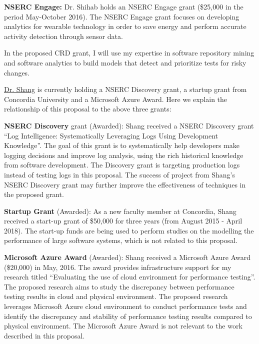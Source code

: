 \documentclass[12pt, letterpaper]{article}
\begin{document}
\textbf{NSERC Engage:} Dr. Shihab holds an NSERC Engage grant (\$25,000 in the period May-October 2016). The NSERC Engage grant focuses on developing analytics for wearable technology in order to save energy and perform accurate activity detection through sensor data.

In the proposed CRD grant, I will use my expertise in software repository mining and software analytics to build models that detect and prioritize tests for risky changes.

\underline{Dr. Shang} is currently holding a NSERC Discovery grant, a startup grant from Concordia University and a Microsoft Azure Award. Here we explain the relationship of this proposal to the above three grants:

\textbf{NSERC Discovery} grant (Awarded): Shang received a NSERC Discovery grant ``Log Intelligence: Systematically Leveraging Logs Using Development Knowledge''. The goal of this grant is to systematically help developers make logging decisions and improve log analysis, using the rich historical knowledge from software development. The Discovery grant is targeting production logs instead of testing logs in this proposal. The success of project from Shang's NSERC Discovery grant may further improve the effectiveness of techniques in the proposed grant.

\textbf{Startup Grant} (Awarded): As a new faculty member at Concordia, Shang received a start-up grant of \$50,000 for three years (from August 2015 - April 2018). The start-up funds are being used to perform studies on the modelling the performance of large software systems, which is not related to this proposal. 

\textbf{Microsoft Azure Award} (Awarded): Shang received a Microsoft Azure Award (\$20,000) in May, 2016. The award provides infrastructure support for my research titled ``Evaluating the use of cloud environment for performance testing''. The proposed research aims to study the discrepancy between performance testing results in cloud and physical environment. The proposed research leverages Microsoft Azure cloud environment to conduct performance tests and identify the discrepancy and stability of performance testing results compared to physical environment. The Microsoft Azure Award is not relevant to the work described in this proposal.
\end{document}
